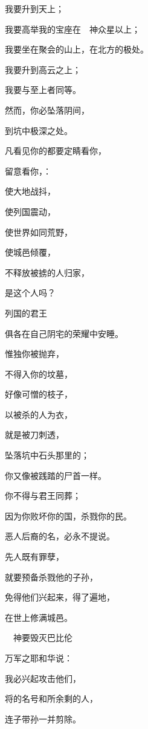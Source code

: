 {\par }{\Q 我要升到天上；
\par }{\Q 我要高举我的宝座在　神众星以上；
\par }{\Q 我要坐在聚会的山上，在北方的极处。
\par }{\Q {}我要升到高云之上；
\par }{\Q 我要与至上者同等。
\par }{\Q {}然而，你必坠落阴间，
\par }{\Q 到坑中极深之处。
\par }{\Q {}凡看见你的都要定睛看你，
\par }{\Q 留意看你，{}：
\par }{\Q 使大地战抖，
\par }{\Q 使列国震动，
\par }{\Q {}使世界如同荒野，
\par }{\Q 使城邑倾覆，
\par }{\Q 不释放被掳的人归家，
\par }{\Q 是这个人吗？
\par }{\Q {}列国的君王
\par }{\Q 俱各在自己阴宅的荣耀中安睡。
\par }{\Q {}惟独你被抛弃，
\par }{\Q 不得入你的坟墓，
\par }{\Q 好像可憎的枝子，
\par }{\Q 以被杀的人为衣，
\par }{\Q 就是被刀刺透，
\par }{\Q 坠落坑中石头那里的；
\par }{\Q 你又像被践踏的尸首一样。
\par }{\Q {}你不得与君王同葬；
\par }{\Q 因为你败坏你的国，杀戮你的民。
\par }{\BB \par }{\Q 恶人后裔的名，必永不提说。
\par }{\Q {}先人既有罪孽，
\par }{\Q 就要预备杀戮他的子孙，
\par }{\Q 免得他们兴起来，得了遍地，
\par }{\Q 在世上修满城邑。
\par }{\SH 　神要毁灭巴比伦
\par }{\Q {}万军之耶和华说：
\par }{\Q 我必兴起攻击他们，
\par }{\Q 将{}的名号和所余剩的人，
\par }{\Q 连子带孙一并剪除。
}
